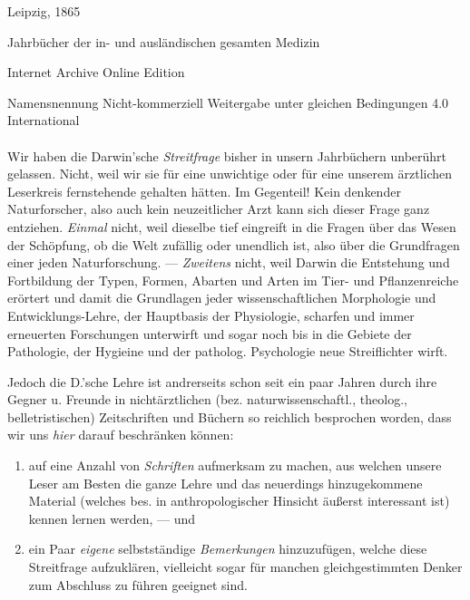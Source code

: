 \documentclass[a4paper, 11pt, oneside, english]{article}
\begin{document}
\begin{titlepage}
	\vspace*{\fill}%
	

	{Leipzig, 1865} %
 
        {\small Jahrbücher der in- und ausländischen gesamten Medizin}

	\vspace{1\baselineskip} %

    Internet Archive Online Edition  %
	
	{\small Namensnennung Nicht-kommerziell Weitergabe unter gleichen Bedingungen 4.0 International } %
\end{titlepage}
\clearpage
\pagestyle{fancy}
\fancyhf{}
\cfoot{\frakfamily{\thepage}}
\Large
\setlength{\parskip}{1mm plus1mm minus1mm}
\paragraph{}
Wir haben die Darwin'sche \emph{Streitfrage} bisher in unsern Jahrbüchern unberührt gelassen. Nicht, weil wir sie für eine unwichtige oder für eine unserem ärztlichen Leserkreis fernstehende gehalten hätten. Im Gegenteil! Kein denkender Naturforscher, also auch kein neuzeitlicher Arzt kann sich dieser Frage ganz entziehen. \emph{Einmal} nicht, weil dieselbe tief eingreift in die Fragen über das Wesen der Schöpfung, ob die Welt zufällig oder unendlich ist, also über die Grundfragen einer jeden Naturforschung. --- \emph{Zweitens} nicht, weil Darwin die Entstehung und Fortbildung der Typen, Formen, Abarten und Arten im Tier- und Pflanzenreiche erörtert und damit die Grundlagen jeder wissenschaftlichen Morphologie und Entwicklungs-Lehre, der Hauptbasis der Physiologie, scharfen und immer erneuerten Forschungen unterwirft und sogar noch bis in die Gebiete der Pathologie, der Hygieine und der patholog. Psychologie neue Streiflichter wirft.

Jedoch die D.'sche Lehre ist andrerseits schon seit ein paar Jahren durch ihre Gegner u. Freunde in nichtärztlichen (bez. naturwissenschaftl., theolog., belletristischen) Zeitschriften und Büchern so reichlich besprochen worden, dass wir uns \emph{hier} darauf beschränken können:
\begin{enumerate}
    \item auf eine Anzahl von \emph{Schriften} aufmerksam zu machen, aus welchen unsere Leser am Besten die ganze Lehre und das neuerdings hinzugekommene Material (welches bes. in anthropologischer Hinsicht äußerst interessant ist) kennen lernen werden, --- und

    \item ein Paar \emph{eigene} selbstständige \emph{Bemerkungen} hinzuzufügen, welche diese Streitfrage aufzuklären, vielleicht sogar für manchen gleichgestimmten Denker zum Abschluss zu führen geeignet sind.
\end{enumerate}
\end{document}
